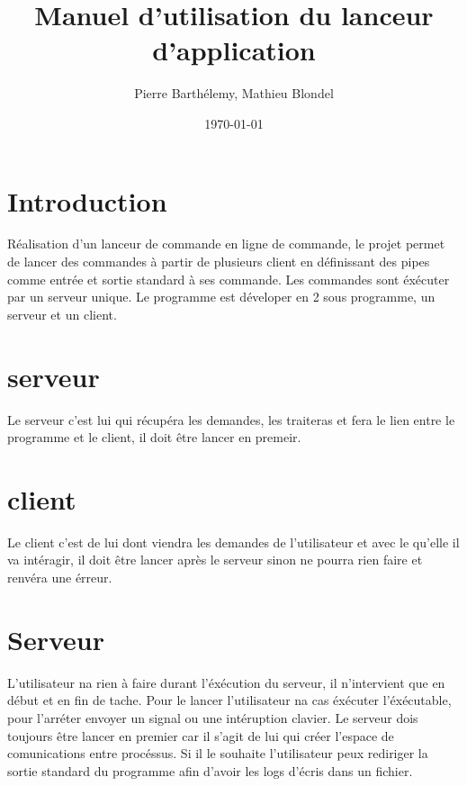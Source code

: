 \documentclass[12pt]{article}
\title{Manuel d'utilisation du lanceur d'application}
\author{Pierre Barthélemy, Mathieu Blondel}
\date{\today}
\begin{document}
\maketitle
\newpage
\tableofcontents
\newpage
\section{Introduction}
    Réalisation d'un lanceur de commande en ligne de commande, le projet permet de lancer des commandes à partir de plusieurs client en définissant des pipes comme entrée et sortie standard à ses commande. Les commandes sont éxécuter par un serveur unique.
    Le programme est déveloper en 2 sous programme, un serveur et un client.
\section*{serveur}
    Le serveur c'est lui qui récupéra les demandes, les traiteras et fera le lien entre le programme et le client, il doit être lancer en premeir.
\section*{client}
    Le client c'est de lui dont viendra les demandes de l'utilisateur et avec le qu'elle il va intéragir, il doit être lancer après le serveur sinon ne pourra rien faire et renvéra une érreur.
\newpage

\section{Serveur}
    L'utilisateur na rien à faire durant l'éxécution du serveur, il n'intervient que en début et en fin de tache.
    Pour le lancer l'utilisateur na cas éxécuter l'éxécutable, pour l'arréter envoyer un signal ou une intéruption clavier.
    Le serveur dois toujours être lancer en premier car il s'agit de lui qui créer l'espace de comunications entre procéssus.
    Si il le souhaite l'utilisateur peux rediriger la sortie standard du programme afin d'avoir les logs d'écris dans un fichier.
\newpage
\end{document}
